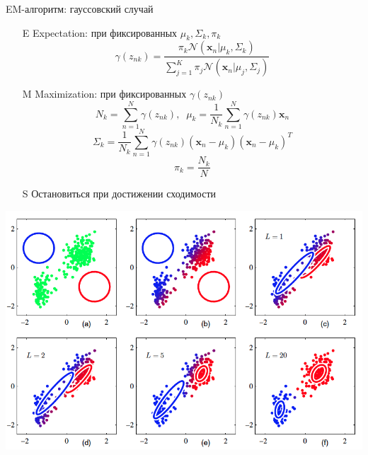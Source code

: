 \documentclass[10pt,a4paper]{beamer}
\begin{document}

\begin{frame}{EM-алгоритм: гауссовский случай}

\begin{enumerate}
\item[E] Expectation: при фиксированных $\mu_k, \Sigma_k, \pi_k$
\[
\gamma(z_{nk}) = \frac{\pi_k \mathcal{N} (\mathbf{x}_n | \mu_k, \Sigma_k)}{\sum_{j=1}^K \pi_j \mathcal{N} (\mathbf{x}_n | \mu_j, \Sigma_j)}
\]
\item[M] Maximization: при фиксированных $\gamma(z_{nk})$
\[
N_k = \sum_{n=1}^N \gamma(z_{nk}), \;\; \mu_k = \frac 1 {N_k} \sum_{n=1}^N \gamma(z_{nk}) \mathbf{x}_n
\]
\[
\Sigma_k = \frac 1 {N_k} \sum_{n=1}^N \gamma(z_{nk}) (\mathbf{x}_n - \mu_k)(\mathbf{x}_n - \mu_k)^T
\]
\[
\pi_k = \frac{N_k}{N}
\]
\item[S] Остановиться при достижении сходимости
\end{enumerate}

\end{frame}


\begin{frame}{}

\begin{center}
\includegraphics[scale=0.35]{images/gauss.png}
\end{center}

\end{frame}

\end{document}
